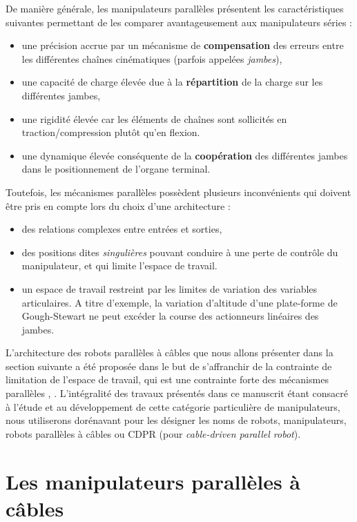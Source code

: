 De manière générale, les manipulateurs parallèles présentent les 
caractéristi\-ques sui\-vantes permettant de les comparer avantageusement aux 
manipulateurs séries :
\begin{itemize}
 \item une précision accrue par un mécanisme de {\bf compensation} des erreurs 
entre les différentes chaînes cinématiques (parfois appelées {\it jambes}),
 \item une capacité de charge élevée due à la {\bf répartition} de la charge 
sur 
les différentes jambes,
 \item une rigidité élevée car les éléments de chaînes sont sollicités en 
traction/compression plutôt qu'en flexion.
 \item une dynamique élevée conséquente de la {\bf coopération} des différentes 
jam\-bes dans le positionnement de l'organe terminal.
\end{itemize}

Toutefois, les mécanismes parallèles possèdent plusieurs inconvénients qui 
doivent être pris en compte lors du choix d'une architecture :
\begin{itemize}
 \item des relations complexes entre entrées et sorties,
 \item des positions dites {\it singulières} pouvant conduire à une perte de 
contrôle du manipulateur, et qui limite l'espace de travail.
 \item un espace de travail restreint par les limites de variation des 
variables articulaires. A titre d'exemple, la variation d'altitude d'une 
plate-forme de Gough-Stewart ne peut excéder la course des actionneurs 
linéaires des jambes.
\end{itemize}

L'architecture des robots parallèles à c\^ables que nous allons présenter dans 
la section suivante a été proposée dans le but de s'affranchir de la contrainte 
de limitation de l'espace de travail, qui est une contrainte forte des 
mécanismes parallèles \cite{journals/jfr/AlbusBD93}, 
\cite{1985:Landsberger.Sheridan*1}. L'intégralité des travaux présentés 
dans ce manuscrit étant consacré à l'étude et au développement de cette 
catégorie particulière de manipulateurs, nous utiliserons dorénavant pour les 
désigner les noms de robots, manipulateurs, robots parallèles à câbles ou CDPR 
(pour {\it cable-driven parallel robot}).

\section{Les manipulateurs parallèles à câbles} \label{chap0-1}

